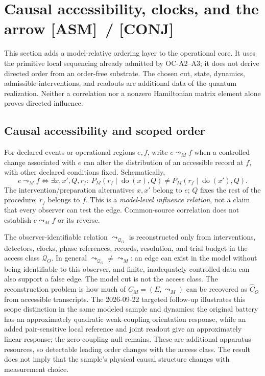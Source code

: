 \documentclass[11pt]{article}
\newcommand{\asm}{\textcolor{blue!70!black}{\textsf{\small[ASM]}}}
\newcommand{\conj}{\textcolor{orange!80!black}{\textsf{\small[CONJ]}}}
\newcommand{\post}{\textcolor{purple!70!black}{\textsf{\small[POST]}}}
\newcommand{\gap}{\textcolor{red!75!black}{\textsf{\small[GAP]}}}
\def\conj{[CONJ]}\def\post{[POST]}\def\gap{[GAP]}%
\def\quad{ }\def\normalsize{}%
\theoremstyle{definition}
\theoremstyle{remark}
\begin{document}
\section{Causal accessibility, clocks, and the arrow \quad{\normalsize\asm\ / \conj}}\label{sec:time}

This section adds a model-relative ordering layer to the operational core. It uses the primitive local sequencing already admitted by OC-A2--A3; it does not derive directed order from an order-free substrate. The chosen cut, state, dynamics, admissible interventions, and readouts are additional data of the quantum realization. Neither a correlation nor a nonzero Hamiltonian matrix element alone proves directed influence.

\subsection*{Causal accessibility and scoped order}
For declared events or operational regions $e,f$, write $e\leadsto_M f$ when a controlled change associated with $e$ can alter the distribution of an accessible record at $f$, with other declared conditions fixed. Schematically,
\[
 e\leadsto_M f\quad\Longleftrightarrow\quad
 \exists x,x',Q,r_f:\ P_M(r_f\mid\operatorname{do}(x),Q)\ne P_M(r_f\mid\operatorname{do}(x'),Q).
\]
The intervention/preparation alternatives $x,x'$ belong to $e$; $Q$ fixes the rest of the procedure; $r_f$ belongs to $f$. This is a \emph{model-level influence relation}, not a claim that every observer can test the edge. Common-source correlation does not establish $e\leadsto_M f$ or its reverse.

The observer-identifiable relation $\leadsto_{\mathcal Q_O}$ is reconstructed only from interventions, detectors, clocks, phase references, records, resolution, and trial budget in the access class $\mathcal Q_O$. In general $\leadsto_{\mathcal Q_O}\ne\leadsto_M$: an edge can exist in the model without being identifiable to this observer, and finite, inadequately controlled data can also support a false edge. The model cut is not the access class. The reconstruction problem is how much of $C_M=(E,\leadsto_M)$ can be recovered as $\widehat C_O$ from accessible transcripts. The 2026-09-22 targeted follow-up illustrates this scope distinction in the same modeled sample and dynamics: the original battery has an approximately quadratic weak-coupling orientation response, while an added pair-sensitive local reference and joint readout give an approximately linear response; the zero-coupling null remains. These are additional apparatus resources, so detectable leading order changes with the access class. The result does not imply that the sample's physical causal structure changes with measurement choice.
\end{document}
